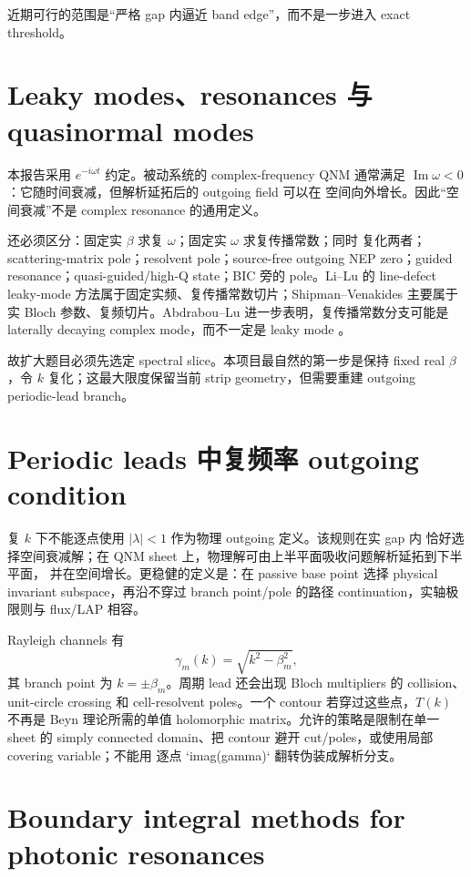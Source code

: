 \documentclass[UTF8,11pt,fontset=none]{ctexart}
\begin{document}
近期可行的范围是“严格 gap 内逼近 band edge”，而不是一步进入 exact threshold。

\section{Leaky modes、resonances 与 quasinormal modes}

本报告采用 \(e^{-i\omega t}\) 约定。被动系统的 complex-frequency QNM 通常满足
\(\operatorname{Im}\omega<0\)：它随时间衰减，但解析延拓后的 outgoing field 可以在
空间向外增长\cite{ShipmanVenakides2003,ShipmanVenakides2005}。因此“空间衰减”不是
complex resonance 的通用定义。

还必须区分：固定实 \(\beta\) 求复 \(\omega\)；固定实 \(\omega\) 求复传播常数；同时
复化两者；scattering-matrix pole；resolvent pole；source-free outgoing NEP zero；guided
resonance；quasi-guided/high-Q state；BIC 旁的 pole。Li--Lu 的 line-defect leaky-mode
方法属于固定实频、复传播常数切片\cite{LiLu2010LeakyWaveguides}；Shipman--Venakides
主要属于实 Bloch 参数、复频切片。Abdrabou--Lu 进一步表明，复传播常数分支可能是
laterally decaying complex mode，而不一定是 leaky mode
\cite{AbdrabouLu2019,AbdrabouLu2022}。

故扩大题目必须先选定 spectral slice。本项目最自然的第一步是保持 fixed real
\(\beta\)，令 \(k\) 复化；这最大限度保留当前 strip geometry，但需要重建 outgoing
periodic-lead branch。

\section{Periodic leads 中复频率 outgoing condition}

复 \(k\) 下不能逐点使用 \(|\lambda|<1\) 作为物理 outgoing 定义。该规则在实 gap 内
恰好选择空间衰减解；在 QNM sheet 上，物理解可由上半平面吸收问题解析延拓到下半平面，
并在空间增长。更稳健的定义是：在 passive base point 选择 physical invariant
subspace，再沿不穿过 branch point/pole 的路径 continuation，实轴极限则与 flux/LAP
相容。

Rayleigh channels 有
\[
  \gamma_m(k)=\sqrt{k^2-\beta_m^2},
\]
其 branch point 为 \(k=\pm\beta_m\)。周期 lead 还会出现 Bloch multipliers 的 collision、
unit-circle crossing 和 cell-resolvent poles。一个 contour 若穿过这些点，\(T(k)\) 不再是
Beyn 理论所需的单值 holomorphic matrix。允许的策略是限制在单一 sheet 的 simply
connected domain、把 contour 避开 cut/poles，或使用局部 covering variable；不能用
逐点 `imag(gamma)` 翻转伪装成解析分支。

\section{Boundary integral methods for photonic resonances}
\end{document}
